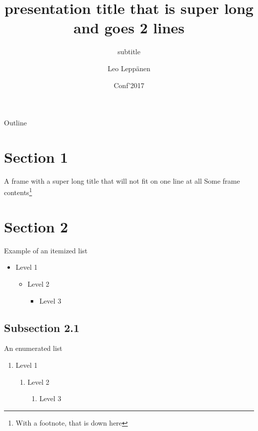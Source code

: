 \documentclass[12pt, t]{beamer}
\title{presentation title that is super long and goes 2 lines}
\subtitle{subtitle}
\author[Leppänen et al.]{Leo Leppänen}
\institute{Department of Computer Science}
\date{Conf'2017}
\begin{document}
\maketitle

\begin{frame}{Outline}
    \begin{center}
        \tableofcontents[hideallsubsections]
    \end{center}
\end{frame}


\section{Section 1}

\begin{frame}{A frame with a super long title that will not fit on one line at all}
    Some frame contents\footnote{With a footnote, that is down here}
\end{frame}

\section{Section 2}

\begin{frame}{Example of an itemized list}
    \begin{itemize}
        \item Level 1
        \begin{itemize}
            \item Level 2
            \begin{itemize}
                \item Level 3
            \end{itemize}
        \end{itemize}
    \end{itemize}
\end{frame}

\subsection{Subsection 2.1}

\begin{frame}{An enumerated list}
    \begin{enumerate}
        \item Level 1
        \begin{enumerate}
            \item Level 2
            \begin{enumerate}
                \item Level 3
            \end{enumerate}
        \end{enumerate}
    \end{enumerate}
\end{frame}
\end{document}
